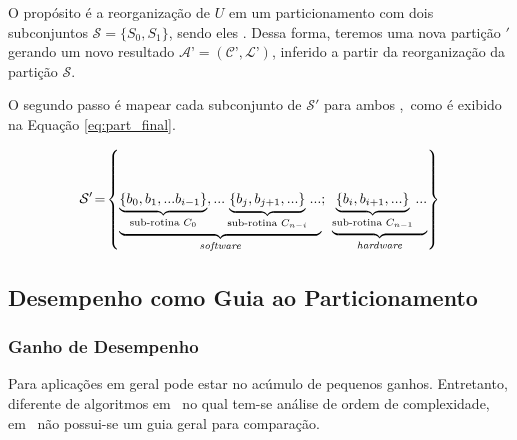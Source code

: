         
        \makeatletter
        \def\@eqnnum{{\normalsize \normalcolor (\theequation)}}
        \makeatother
        
        O propósito é a reorganização de $U$ em um particionamento com dois subconjuntos  $ \mathcal{S} = \{S_0, S_1\} $, sendo eles \hs.
        Dessa forma, teremos uma nova partição \Ss$'$ gerando um novo resultado $ \mathcal{A}’ = (\mathcal{C}’, \mathcal{L}’) $, inferido a partir da reorganização da partição $ \mathcal{S} $.
        
        O segundo passo é mapear cada subconjunto de $ \mathcal{S}' $ para ambos \hs,\ como é exibido na Equação \ref{eq:part_final}.
        
        { \small
        \begin{equation}
        \mathcal{S}'\!=\!\left \{
        \underbrace{
        \underbrace{
        \left \{ b_0, b_1, ... b_{i-1} \right \}
        }_{\textnormal{sub-rotina }C_0},
        ...
        \underbrace{
        \left \{ b_j, b_{j+1}, ... \right \}
        }_{\textnormal{sub-rotina }C_{n-i}}
        ...
        }_{\textnormal{\software}};
        \ 
        \underbrace{
        \underbrace{
        \left \{ b_i, b_{i+1}, ... \right \}
        }_{\textnormal{sub-rotina }C_{n-1}}
        ...
        }_{\textnormal{\hardware}}
        \right \} \label{eq:part_final}
        \end{equation}
        }
        
    
    
    \subsection{Desempenho como Guia ao Particionamento \HS} \label{sec:ganho_performance}
        \subsubsection{Ganho de Desempenho}
            Para aplicações em geral pode estar no acúmulo de pequenos ganhos.
            Entretanto, diferente de algoritmos em \software\ no qual tem-se análise de ordem de complexidade, em \hardware\ não possui-se um guia geral para comparação.
            
